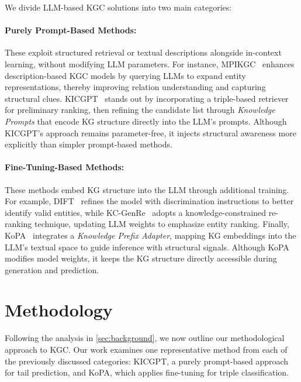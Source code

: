 \documentclass[12pt,a4paper]{article}
\begin{document}
We divide LLM-based KGC solutions into two main categories:

\paragraph{Purely Prompt-Based Methods:} These exploit structured retrieval or textual descriptions alongside in-context learning, without modifying LLM parameters.
For instance, MPIKGC~\cite{xu2024mpikgc} enhances description-based KGC models by querying LLMs to expand entity representations, thereby improving relation understanding and capturing structural clues.
KICGPT~\cite{wei2023kicgpt} stands out by incorporating a triple-based retriever for preliminary ranking, then refining the candidate list through \emph{Knowledge Prompts} that encode KG structure directly into the LLM's prompts.
Although KICGPT's approach remains parameter-free, it injects structural awareness more explicitly than simpler prompt-based methods.

\paragraph{Fine-Tuning-Based Methods:} These methods embed KG structure into the LLM through additional training.
For example, DIFT~\cite{liu2024dift} refines the model with discrimination instructions to better identify valid entities, while KC-GenRe~\cite{wang2024kcgenre} adopts a knowledge-constrained re-ranking technique, updating LLM weights to emphasize entity ranking.
Finally, KoPA~\cite{qin2023kopa} integrates a \emph{Knowledge Prefix Adapter}, mapping KG embeddings into the LLM's textual space to guide inference with structural signals.
Although KoPA modifies model weights, it keeps the KG structure directly accessible during generation and prediction.


%
%


\section{Methodology}\label{sec:methodology}

Following the analysis in \cref{sec:background}, we now outline our methodological approach to KGC. Our work examines one representative method from each of the previously discussed categories: KICGPT, a purely prompt-based approach for tail prediction, and KoPA, which applies fine-tuning for triple classification.
\end{document}
